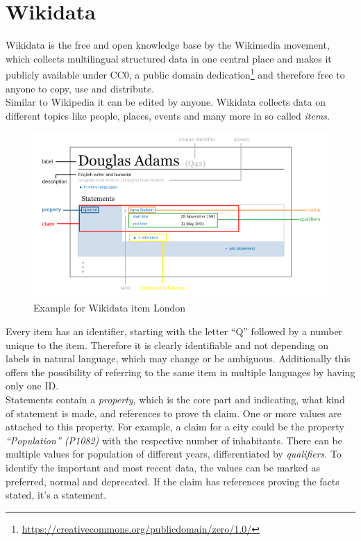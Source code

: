 \section{Wikidata}

Wikidata is the free and open knowledge base by the Wikimedia movement, which collects multilingual structured data in one central place and makes it publicly available under CC0, a public domain dedication\footnote{\href{https://creativecommons.org/publicdomain/zero/1.0/}{https://creativecommons.org/publicdomain/zero/1.0/}} and therefore free to anyone to copy, use and distribute. \\
Similar to Wikipedia it can be edited by anyone. Wikidata collects data on different topics like people, places, events and many more in so called \textit{items}.
\begin{figure}[H]
	\centering
	\includegraphics[width=\textwidth]{diagrams/Wikidata_statement.png}
	\caption{Example for Wikidata item London}
	\label{diagramWikidataStatement}
\end{figure}
Every item has an identifier, starting with the letter ``Q'' followed by a number unique to the item. Therefore it is clearly identifiable and not depending on labels in natural language, which may change or be ambiguous. Additionally this offers the possibility of referring to the same item in multiple languages by having only one ID. \\
Statements contain a \textit{property}, which is the core part and indicating, what kind of statement is made, and references to prove th claim. One or more values are attached to this property. For example, a claim for a city could be the property \textit{``Population'' (P1082)} with the respective number of inhabitants. There can be multiple values for population of different years, differentiated by \textit{qualifiers}. To identify the important and most recent data, the values can be marked as preferred, normal and deprecated. If the claim has references proving the facts stated, it's a statement. \\
